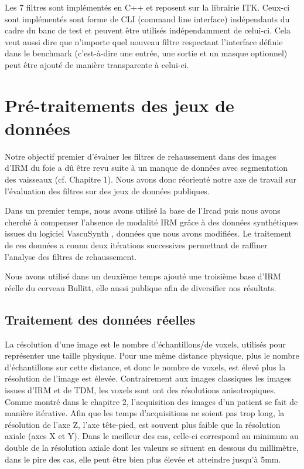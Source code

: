 Les 7 filtres sont implémentés en C++ et reposent sur la librairie ITK. Ceux-ci sont implémentés sont forme de CLI (command line interface) indépendants du cadre du banc de test et peuvent être utilisés indépendamment de celui-ci. Cela veut aussi dire que n'importe quel nouveau filtre respectant l'interface définie dans le benchmark (c'est-à-dire une entrée, une sortie et un masque optionnel) peut être ajouté de manière transparente à celui-ci.

\section{Pré-traitements des jeux de données}
\label{sec:Benchmark:traitement_des_données}

Notre objectif premier d'évaluer les filtres de rehaussement dans des images d'IRM du foie a dû être revu suite à un manque de données avec segmentation des vaisseaux (cf. Chapitre 1). Nous avons donc réorienté notre axe de travail sur l'évaluation des filtres sur des jeux de données publiques.

Dans un premier temps, nous avons utilisé la base de l'Ircad puis nous avons cherché à compenser l'absence de modalité IRM grâce à des données synthétiques issues du logiciel VascuSynth \cite{Hamarneh2010_VascuSynth}, données que nous avons modifiées. Le traitement de ces données a connu deux itérations successives permettant de raffiner l'analyse des filtres de rehaussement.

Nous avons utilisé dans un deuxième temps ajouté une troisième base d'IRM réelle du cerveau Bullitt, elle aussi publique afin de diversifier nos résultats.

\subsection{Traitement des données réelles}

La résolution d'une image est le nombre d'échantillons/de voxels, utilisés pour représenter une taille physique. Pour une même distance physique, plus le nombre d'échantillons sur cette distance, et donc le nombre de voxels, est élevé plus la résolution de l'image est élevée. Contrairement aux images classiques les images issues d'IRM et de TDM, les voxels sont ont des résolutions anisotropiques. Comme montré dans le chapitre 2, l'acquisition des images d'un patient se fait de manière itérative. Afin que les temps d'acquisitions ne soient pas trop long, la résolution de l'axe Z, l'axe tête-pied, est souvent plus faible que la résolution axiale (axes X et Y). Dans le meilleur des cas, celle-ci correspond au minimum au double de la résolution axiale dont les valeurs se situent en dessous du millimètre, dans le pire des cas, elle peut être bien plus élevée et atteindre jusqu'à 5mm.

